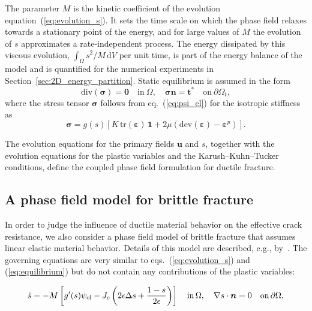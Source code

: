 \documentclass[pdflatex,sn-mathphys-num]{sn-jnl}%
\theoremstyle{thmstyleone}%
\theoremstyle{thmstyletwo}%
\theoremstyle{thmstylethree}%
\begin{document}
The parameter $M$ is the kinetic coefficient of the evolution equation~(\ref{eq:evolution_s}). It sets the time scale on which the phase field relaxes towards a stationary point of the energy, and for large values of $M$ the evolution of $s$ approximates a rate-independent process. The energy dissipated by this viscous evolution, $\int_\Omega \dot{s}^2/M\,\mathrm{d}V$ per unit time, is part of the energy balance of the model and is quantified for the numerical experiments in Section~\ref{sec:2D_energy_partition}.
Static equilibrium is assumed in the form
\begin{equation}
    \text{div}(\boldsymbol{\sigma}) = \boldsymbol{0} \quad \text{in} \ \Omega, 
    \quad 
    \boldsymbol{\sigma}\boldsymbol{n} = \boldsymbol{t}^* 
    \quad \text{on} \ \partial\Omega_t,
    \label{eq:equilibrium}
\end{equation}
where the stress tensor $\boldsymbol{\sigma}$ follows from eq.~(\ref{eq:psi_el}) for the isotropic stiffness as
\begin{equation}
    \boldsymbol{\sigma} = g(s)\left[
    K\,\text{tr}(\boldsymbol{\varepsilon})\,\boldsymbol{1}
    + 2\mu\left(\text{dev}(\boldsymbol{\varepsilon}) - \boldsymbol{\varepsilon}^p\right)
    \right].
    \label{eq:sigma_plast}
\end{equation}

The evolution equations for the primary fields $\boldsymbol{u}$ and $s$, together with the evolution equations for the plastic variables and the Karush--Kuhn--Tucker conditions, define the coupled phase field formulation for ductile fracture.


\subsection{A phase field model for brittle fracture}
\label{sec:phasefield_elastic}

In order to judge the influence of ductile material behavior on the effective crack resistance, 
we also consider a phase field model of brittle fracture that assumes linear elastic material behavior. 
Details of this model are described, e.g., by~\cite{kuhn_continuum_2010}. The governing equations 
are very similar to eqs.~(\ref{eq:evolution_s}) and (\ref{eq:equilibrium}) but do not contain
any contributions of the plastic variables:

\begin{equation}
    \dot{s} = -M \left[g'(s)\psi_{\rm{el}}  - J_c\left(2\epsilon\Delta{s} + \dfrac{1-s}{2\epsilon}\right)\right] \quad \text{in} \, \Omega, \quad \nabla{s}\cdot{\boldsymbol{n}} = 0\quad\text{on}\,\partial\Omega,
    \label{eq:evolution_s_elastic}
\end{equation}
\end{document}
